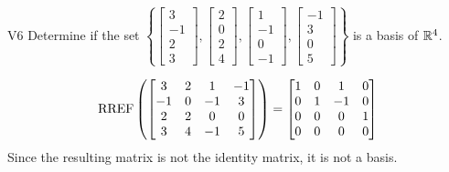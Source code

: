 \begin{problem}{V6}
  Determine if the set \(\left\{
    \begin{bmatrix} 3 \\ -1 \\ 2 \\3 \end{bmatrix},
    \begin{bmatrix} 2 \\ 0 \\ 2 \\ 4\end{bmatrix},
    \begin{bmatrix} 1 \\ -1 \\ 0 \\ -1\end{bmatrix},
    \begin{bmatrix} -1 \\ 3 \\ 0 \\ 5\end{bmatrix}
  \right\}\) is a basis of \(\mathbb{R}^4\).
\end{problem}
\begin{solution}
  \[\operatorname{RREF}\left(
    \begin{bmatrix}
      3 & 2 & 1 & -1\\
      -1 & 0 & -1 & 3\\
      2 & 2 & 0 & 0\\
      3 & 4 & -1 & 5\\
    \end{bmatrix} \right)= \begin{bmatrix}
      1 & 0 & 1 & 0 \\
      0 & 1 & -1 & 0 \\
      0 & 0 & 0 & 1 \\
      0 & 0 & 0 & 0
    \end{bmatrix}
  \]
Since the resulting matrix is not the identity matrix, it is not a basis.
\end{solution}


